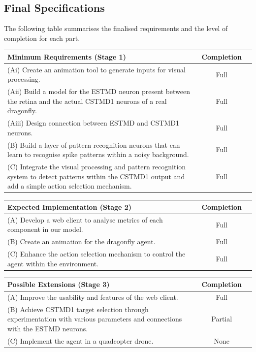 \documentclass[a4paper,11pt]{article}
\begin{document}
\subsection{Final Specifications}
The following table summarises the finalised requirements and the level of completion for each part.
\begin{center}
    \begin{tabular}{p{12cm} c c}
    \textbf{Minimum Requirements (Stage 1)} & \textbf{Completion} \\ \hline
    (Ai) Create an animation tool to generate inputs for visual processing. & Full \\ 
	(Aii) Build a model for the ESTMD neuron present between the retina and the actual CSTMD1 neurons of a real dragonfly. & Full \\
	(Aiii) Design connection between ESTMD and CSTMD1 neurons. & Full \\
	(B) Build a layer of pattern recognition neurons that can learn to recognise spike patterns within a noisy background. & Full\\
	(C) Integrate the visual processing and pattern recognition system to detect patterns within the CSTMD1 output and add a simple action selection mechanism. & Full\\
    \end{tabular}
\end{center}

\begin{center}
    \begin{tabular}{p{12cm} c c}
    \textbf{Expected Implementation (Stage 2)} & \textbf{Completion} \\ \hline
	(A) Develop a web client to analyse metrics of each component in our model. & Full \\
	(B) Create an animation for the dragonfly agent. & Full\\
	(C) Enhance the action selection mechanism to control the agent within the environment. & Full\\
    \end{tabular}
\end{center}

\begin{center}
    \begin{tabular}{p{12cm} c c}
    \textbf{Possible Extensions (Stage 3)} & \textbf{Completion} \\ \hline
	(A) Improve the usability and features of the web client. & Full\\
	(B) Achieve CSTMD1 target selection through experimentation with various parameters and connections with the ESTMD neurons. & Partial\\
	(C) Implement the agent in a quadcopter drone. & None\\
    \end{tabular}
\end{center}
\end{document}
